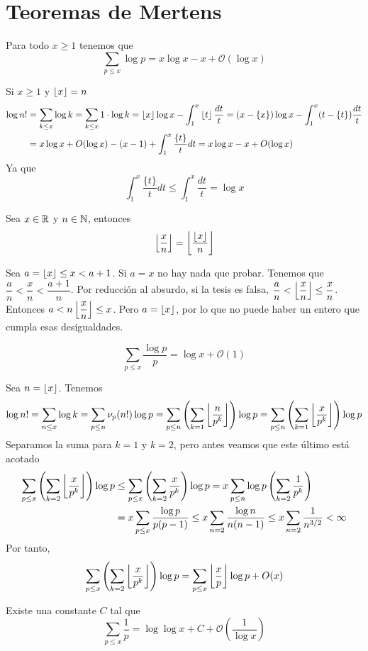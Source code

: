 \documentclass[TAN.tex]{subfiles}
\begin{document}
\section{Teoremas de Mertens}
\begin{teorema} Para todo $x\geq 1$ tenemos que
\[ \sum_{p≤x} {\log p} = x\log x -x+ \mathcal{O}(\log x) \]
\end{teorema}

\begin{dem}
Si $x\geq 1$ y $\left\lfloor{ x }\right\rfloor = n$
\begin{align*}
\log n! &= \sum_{k\leq x} \log k = \sum_{k \leq x} 1 \cdot \log k = \left\lfloor{ x }\right\rfloor\log x - \int_1^x \left\lfloor{ t }\right\rfloor \frac{dt}{t} = (x-\left\{{x}\right\})\log x - \int_1^x (t-\left\{{t}\right\})\frac{dt}{t}\\
& =
x\log x + O(\log x) - (x-1) + \int_1^x\frac{\{t\}}{t}dt =  x\log x - x  + O(\log x)
\end{align*}
Ya que 
$$
 \int_1^x\frac{\{t\}}{t}dt  \leq  \int_1^x\frac{dt}{t} = \log x 
$$
\end{dem}
\begin{lemma}
Sea $x\in\mathbb{R}$ y $n\in\mathbb{N}$, entonces
$$
\left\lfloor{\frac{x}{n}}\right\rfloor = \left\lfloor{\frac{\left\lfloor{x}\right\rfloor}{n}}\right\rfloor
$$
\end{lemma}
\begin{dem}
Sea $a=\left\lfloor{x}\right\rfloor\leq x < a+1$. Si $a=x$ no hay nada que probar. Tenemos que $\dfrac{a}{n}<\dfrac{x}{n}<\dfrac{a+1}{n}$. Por reducción al absurdo, si la tesis es falsa, $\dfrac{a}{n}<\left\lfloor{\dfrac{x}{n}}\right\rfloor\leq \dfrac{x}{n}$. Entonces $a<n\left\lfloor{\dfrac{x}{n}}\right\rfloor\leq x$. Pero $a=\left\lfloor{x}\right\rfloor$, por lo que no puede haber un entero que cumpla esas desigualdades.
\end{dem}
\begin{teorema}
\[ \sum_{p≤x} \frac{\log p}{p} = \log x + \mathcal{O}(1) \]
\end{teorema}
\begin{dem}
Sea $n=\left\lfloor{x}\right\rfloor$. Tenemos
$$
\log n! = \sum_{n\leq x} \log k = \sum_{p\leq n}\nu_p(n!)\log p = \sum_{p\leq n}\left(\sum_{k=1}\left\lfloor{\frac{n}{p^k}}\right\rfloor\right)\log p
=  \sum_{p\leq n}\left(\sum_{k=1}\left\lfloor{\frac{x}{p^k}}\right\rfloor\right)\log p$$
Separamos la suma para $k=1$ y $k=2$, pero antes veamos que este último está acotado
\begin{align*}
\sum_{p\leq x}\left(\sum_{k=2}\left\lfloor{\frac{x}{p^k}}\right\rfloor\right)\log p &\leq \sum_{p\leq x}\left(\sum_{k=2}\frac{x}{p^k}\right)\log p = x\sum_{p\leq n}\log p\left(\sum_{k=2}\frac{1}{p^k}\right)\\
&= x\sum_{p\leq x} \frac{\log p }{p(p-1)} \leq x\sum_{n=2} \frac{\log n}{n(n-1)}\leq x \sum_{n=2}\frac{1}{n^{3/2}}<\infty
\end{align*}
Por tanto,
$$
\sum_{p\leq x}\left(\sum_{k=2}\left\lfloor{\frac{x}{p^k}}\right\rfloor\right)\log p = \sum_{p\leq x}\left\lfloor{\frac{x}{p}}\right\rfloor\log p+O(x) 
$$
\end{dem}
\begin{teorema}[Mertens]
Existe una constante $C$ tal que
\[ \sum_{p≤x} \frac{1}{p} = \log \log x + C + \mathcal{O}\left(\frac{1}{\log x}\right) \]
\end{teorema}
\end{document}
